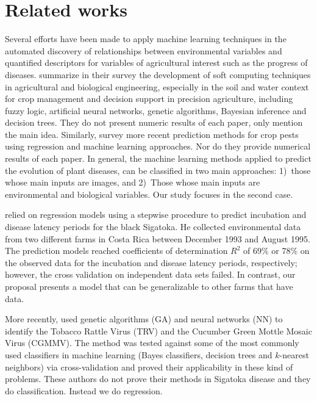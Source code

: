\section{Related works}
\label{sec:related}

Several efforts have been made to apply machine learning techniques in
the automated discovery of relationships between environmental
variables and quantified descriptors for variables of agricultural 
interest such as the progress of diseases.
% 
\citet{Huang2010} summarize in their survey the
development of soft computing techniques in agricultural and
biological engineering, especially in the soil and water context for crop management and decision support in precision agriculture, including fuzzy logic, artificial neural
networks, genetic algorithms, Bayesian inference and decision trees. They do not present numeric results of each paper, only mention the main idea.
%
Similarly, \citet{Kim2014} survey more recent prediction
methods for crop pests using regression and machine learning approaches. Nor do they provide numerical results of each paper.
%
In general, the machine learning methods applied to predict the
evolution of plant diseases, can be classified in two main approaches:
1)~those whose main inputs are images, and 2)~Those whose main inputs
are environmental and biological variables. Our study focuses in the
second case.


% 
%
%

\citet{Romero1995} relied on regression models using a stepwise
procedure to predict incubation and disease latency periods for the
black Sigatoka.
% 
He collected environmental data from two different farms in Costa Rica
between December 1993 and August 1995.
%
The prediction models reached coefficients of determination $R^2$ of
69\% or 78\% on the observed data for the incubation and disease
latency periods, respectively; however, the cross validation on
independent data sets failed.
%
In contrast, our proposal presents a model that can be generalizable to other farms that have data.

More recently, \citet{Glezakos2010} used genetic algorithms (GA) and
neural networks (NN) to identify the Tobacco Rattle Virus (TRV) and
the Cucumber Green Mottle Mosaic Virus (CGMMV).
%
The method was tested against some of the most commonly used
classifiers in machine learning (Bayes classifiers, decision trees and
$k$-nearest neighbors) via cross-validation and proved their
applicability in these kind of problems.
%
These authors do not prove their methods in Sigatoka disease and they do classification. Instead we do regression.

